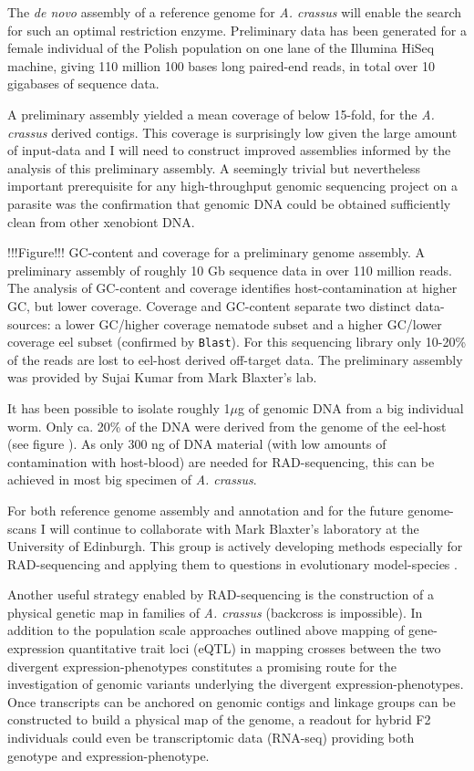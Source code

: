 \documentclass[10pt]{article}
\begin{document}
The \textit{de novo} assembly of a reference genome for
\textit{A. crassus} will enable the search for such an optimal
restriction enzyme. Preliminary data has been generated for a female
individual of the Polish population on one lane of the Illumina HiSeq
machine, giving 110 million 100 bases long paired-end reads, in total
over 10 gigabases of sequence data.

A preliminary assembly yielded a mean coverage of below 15-fold, for
the \textit{A. crassus} derived contigs. This coverage is surprisingly
low given the large amount of input-data and I will need to construct
improved assemblies informed by the analysis of this preliminary
assembly. A seemingly trivial but nevertheless important prerequisite
for any high-throughput genomic sequencing project on a parasite was
the confirmation that genomic DNA could be obtained sufficiently clean
from other xenobiont DNA.

!!!Figure!!! GC-content and coverage for a preliminary genome
assembly. A preliminary assembly of roughly 10 Gb sequence data in
over 110 million reads. The analysis of GC-content and coverage
identifies host-contamination at higher GC, but lower
coverage. Coverage and GC-content separate two distinct data-sources:
a lower GC/higher coverage nematode subset and a higher GC/lower
coverage eel subset (confirmed by \texttt{Blast}). For this sequencing
library only 10-20\% of the reads are lost to eel-host derived
off-target data. The preliminary assembly was provided by Sujai Kumar
from Mark Blaxter's lab.

It has been possible to isolate roughly 1$\mu$g of genomic DNA from a
big individual worm. Only ca. 20\% of the DNA were derived from the
genome of the eel-host (see figure ). As only 300
ng of DNA material (with low amounts of contamination with host-blood)
are needed for RAD-sequencing, this can be achieved in most big
specimen of \textit{A. crassus}.

For both reference genome assembly and annotation and for the future
genome-scans I will continue to collaborate with Mark Blaxter's
laboratory at the University of Edinburgh. This group is actively
developing methods especially for RAD-sequencing and applying them to
questions in evolutionary model-species \cite{pmid21681211}.

Another useful strategy enabled by RAD-sequencing is the construction
of a physical genetic map in families of \textit{A. crassus}
(backcross is impossible). In addition to the population scale
approaches outlined above mapping of gene-expression quantitative
trait loci (eQTL) in mapping crosses between the two divergent
expression-phenotypes constitutes a promising route for the
investigation of genomic variants underlying the divergent
expression-phenotypes. Once transcripts can be anchored on genomic
contigs and linkage groups can be constructed to build a physical map
of the genome, a readout for hybrid F2 individuals could even be
transcriptomic data (RNA-seq) providing both genotype and
expression-phenotype.
\end{document}
